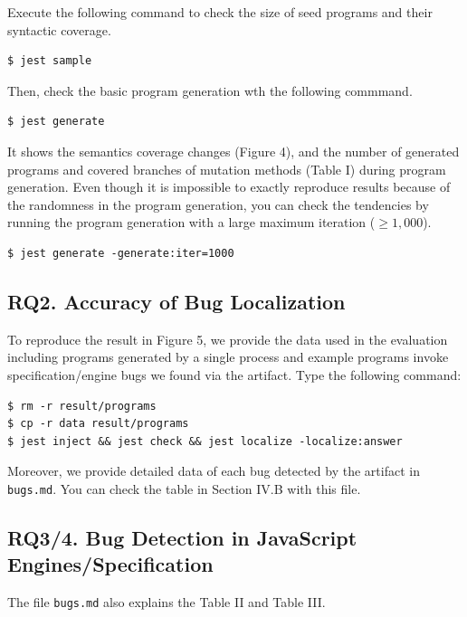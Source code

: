 \documentclass{article}
\begin{document}
Execute the following command to check the size of seed programs and their
syntactic coverage.
\begin{lstlisting}
$ jest sample
\end{lstlisting}
Then, check the basic program generation wth the following commmand.
\begin{lstlisting}
$ jest generate
\end{lstlisting}
It shows the semantics coverage changes (Figure 4), and the number of generated
programs and covered branches of mutation methods (Table I) during program
generation.  Even though it is impossible to exactly reproduce results because
of the randomness in the program generation, you can check the tendencies by
running the program generation with a large maximum iteration ($\geq 1,000$).
\begin{lstlisting}
$ jest generate -generate:iter=1000
\end{lstlisting}

\subsection{RQ2. Accuracy of Bug Localization}

To reproduce the result in Figure 5, we provide the data used in the evaluation
including programs generated by a single process and example programs invoke
specification/engine bugs we found via the artifact.  Type the following
command:
\begin{lstlisting}
$ rm -r result/programs
$ cp -r data result/programs
$ jest inject && jest check && jest localize -localize:answer
\end{lstlisting}
Moreover, we provide detailed data of each bug detected by the artifact in
\texttt{bugs.md}. You can check the table in Section IV.B with this file.

\subsection{RQ3/4. Bug Detection in JavaScript Engines/Specification}

The file \texttt{bugs.md} also explains the Table II and Table III.
\end{document}
